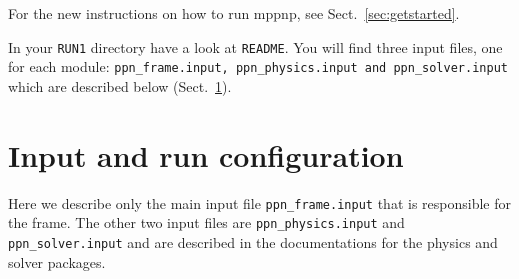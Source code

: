 For the new instructions on how to run mppnp, see Sect.\ \ref{sec:getstarted}.

In your \texttt{RUN1} directory have a look at \texttt{README}. You
will find three input files, one for each module:
\texttt{ppn\_frame.input, ppn\_physics.input and ppn\_solver.input}
which are described below (Sect.\ \ref{sec:iofiles}).




\section{Input and run configuration}
\label{sec:iofiles}

Here we describe only the main input file \texttt{ppn\_frame.input}
that is responsible for the frame. The other two input files are
\texttt{ppn\_physics.input} and \texttt{ppn\_solver.input} and are
described in the documentations for the physics and solver packages.

